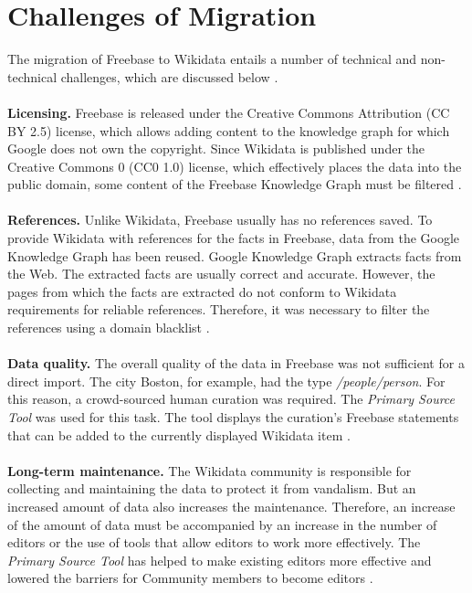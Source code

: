 ﻿\documentclass[11pt,titlepage,oneside,openany]{book}
\begin{document}
\section{Challenges of Migration}
The migration of Freebase to Wikidata entails a number of technical and non-technical challenges, which are discussed below \cite{Tanon2016FromFT}.
\\
\\
\textbf{Licensing. } Freebase is released under the Creative Commons Attribution (CC BY 2.5) license, which allows adding content to the knowledge graph for which Google does not own the copyright. Since Wikidata is published under the Creative Commons 0 (CC0 1.0) license, which effectively places the data into the public domain, some content of the Freebase Knowledge Graph must be filtered \cite{Tanon2016FromFT}.
\\
\\
\textbf{References. } Unlike Wikidata, Freebase usually has no references saved. To provide Wikidata with references for the facts in Freebase, data from the Google Knowledge Graph has been reused. Google Knowledge Graph extracts facts from the Web. The extracted facts are usually correct and accurate. However, the pages from which the facts are extracted do not conform to Wikidata requirements for reliable references. Therefore, it was necessary to filter the references using a domain blacklist \cite{Tanon2016FromFT}.
\\
\\
\textbf{Data quality. } The overall quality of the data in Freebase was not sufficient for a direct import. The city Boston, for example, had the type \textit{/people/person}. For this reason, a crowd-sourced human curation was required. The \textit{Primary Source Tool} was used for this task. The tool displays the curation's Freebase statements that can be added to the currently displayed Wikidata item \cite{Tanon2016FromFT}. 
\\
\\
\textbf{Long-term maintenance. } The Wikidata community is responsible for collecting and maintaining the data to protect it from vandalism. But an increased amount of data also increases the maintenance. Therefore, an increase of the amount of data must be accompanied by an increase in the number of editors or the use of tools that allow editors to work more effectively. The \textit{Primary Source Tool} has helped to make existing editors more effective and lowered the barriers for Community members to become editors \cite{Tanon2016FromFT}.
\end{document}
